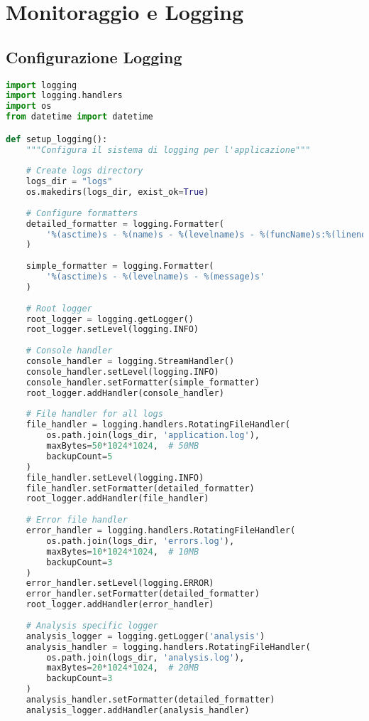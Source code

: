 \documentclass[12pt,a4paper]{report}
\begin{document}
\section{Monitoraggio e Logging}

\subsection{Configurazione Logging}

\begin{lstlisting}[language=python, caption=Logging Configuration]
import logging
import logging.handlers
import os
from datetime import datetime

def setup_logging():
    """Configura il sistema di logging per l'applicazione"""
    
    # Create logs directory
    logs_dir = "logs"
    os.makedirs(logs_dir, exist_ok=True)
    
    # Configure formatters
    detailed_formatter = logging.Formatter(
        '%(asctime)s - %(name)s - %(levelname)s - %(funcName)s:%(lineno)d - %(message)s'
    )
    
    simple_formatter = logging.Formatter(
        '%(asctime)s - %(levelname)s - %(message)s'
    )
    
    # Root logger
    root_logger = logging.getLogger()
    root_logger.setLevel(logging.INFO)
    
    # Console handler
    console_handler = logging.StreamHandler()
    console_handler.setLevel(logging.INFO)
    console_handler.setFormatter(simple_formatter)
    root_logger.addHandler(console_handler)
    
    # File handler for all logs
    file_handler = logging.handlers.RotatingFileHandler(
        os.path.join(logs_dir, 'application.log'),
        maxBytes=50*1024*1024,  # 50MB
        backupCount=5
    )
    file_handler.setLevel(logging.INFO)
    file_handler.setFormatter(detailed_formatter)
    root_logger.addHandler(file_handler)
    
    # Error file handler
    error_handler = logging.handlers.RotatingFileHandler(
        os.path.join(logs_dir, 'errors.log'),
        maxBytes=10*1024*1024,  # 10MB
        backupCount=3
    )
    error_handler.setLevel(logging.ERROR)
    error_handler.setFormatter(detailed_formatter)
    root_logger.addHandler(error_handler)
    
    # Analysis specific logger
    analysis_logger = logging.getLogger('analysis')
    analysis_handler = logging.handlers.RotatingFileHandler(
        os.path.join(logs_dir, 'analysis.log'),
        maxBytes=20*1024*1024,  # 20MB
        backupCount=3
    )
    analysis_handler.setFormatter(detailed_formatter)
    analysis_logger.addHandler(analysis_handler)
    

\end{lstlisting}
\end{document}
